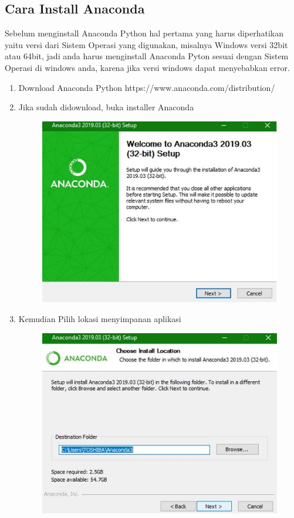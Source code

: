 \subsection{Cara Install Anaconda}
Sebelum menginstall Anaconda Python hal pertama yang harus diperhatikan yaitu versi dari Sistem Operasi yang digunakan, misalnya Windows versi 32bit atau 64bit, jadi anda harus menginstall Anaconda Pyton sesuai dengan Sistem Operasi di windows anda, karena jika versi windows dapat menyebabkan error.
\begin{enumerate}
    \item Download Anaconda Python https://www.anaconda.com/distribution/
    \item Jika sudah didownload, buka installer Anaconda
    \begin{figure}[!htbp]
        \centering
        \includegraphics[scale=0.6]{figure/Anaconda/1.jpeg}
        \label{gambar 1}
    \end{figure}
    \vspace{2cm}
    \item Kemudian Pilih lokasi menyimpanan aplikasi
    \begin{figure}[!htbp]
        \centering
        \includegraphics[scale=0.6]{figure/Anaconda/3.jpeg}

\end{figure}
\end{enumerate}
